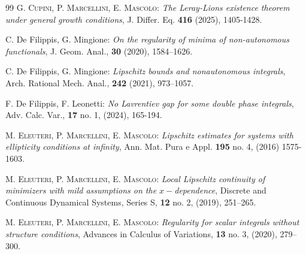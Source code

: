 \documentclass[12pt]{amsart}
\theoremstyle{definition}
\numberwithin{equation}{section}
\numberwithin{equation}{section}
\begin{document}
{\begin{thebibliography}{99}
 \textsc{G. Cupini, P. Marcellini, E. Mascolo:} \emph{The Leray-Lions existence theorem under
general growth conditions}, J. Differ. Eq. {\bf 416} (2025), 1405-1428.


 {\sc C. De Filippis, G. Mingione:} \emph{On the regularity of minima of non-autonomous functionals}, J. Geom. Anal., {\bf 30} (2020), 1584–1626.


 {\sc C. De Filippis, G. Mingione:} \emph{Lipschitz bounds and nonautonomous integrals}, Arch. Rational Mech. Anal., {\bf 242}  (2021), 973–1057.

 {\sc F. De Filippis, F. Leonetti:} \emph{No Lavrentiev gap for some double phase integrals}, Adv.  Calc.  Var., {\bf 17} no. 1, (2024), 165-194.

 \textsc{M. Eleuteri, P. Marcellini, E. Mascolo:} \emph{Lipschitz estimates for systems with ellipticity conditions at infinity}, Ann. Mat. Pura e Appl.  \textbf{195} no. 4, (2016) 1575-1603.
%








  \textsc{M. Eleuteri, P. Marcellini, E. Mascolo:} \emph{Local Lipschitz continuity of minimizers with mild assumptions on the $x-$dependence}, Discrete and Continuous Dynamical Systems, Series S, {\bf 12} no. 2, (2019), 251–265.

%
 \textsc{M. Eleuteri, P. Marcellini, E. Mascolo:} \emph{Regularity for scalar integrals without structure conditions}, Advances in Calculus of Variations, {\bf 13} no. 3, (2020), 279–300.


\end{thebibliography}}
\end{document}
